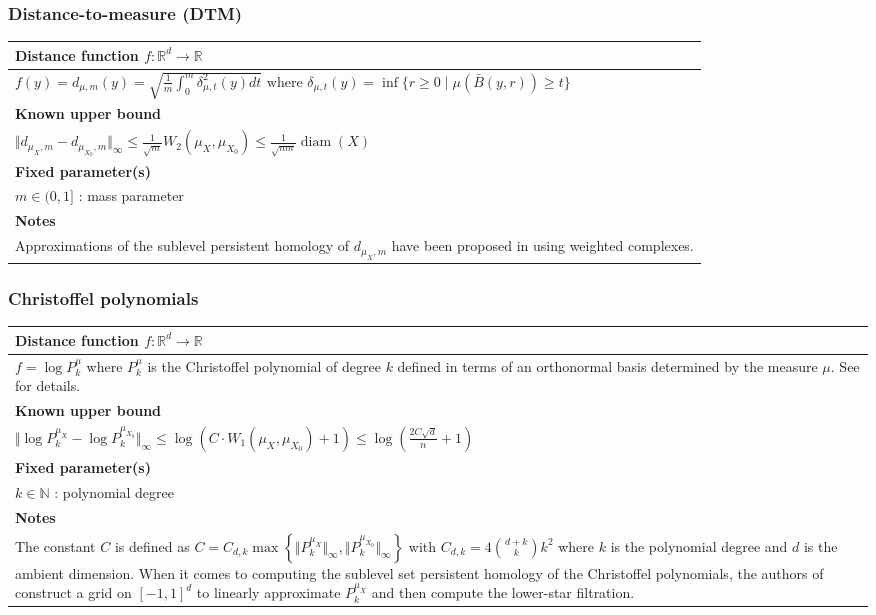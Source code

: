\documentclass[10pt,a4paper]{article}
\theoremstyle{definition}
\newcommand{\R}{\mathbb{R}}
\begin{document}
\subsubsection{Distance-to-measure (DTM)}
\begin{tabularx}{\textwidth}{|X|}
	\hline
	\textbf{Distance function $f\colon\R^d\to\R$}  \\ \hline
	$
	f(y) = d_{\mu, m}(y) = \sqrt{\frac{1}{m}\int_0^m\delta^2_{\mu,t}(y)dt}
	\text{ where }
	\delta_{\mu, t}(y) = \inf\{r\geq0\mid\mu(\bar{B}(y,r))\geq t\}
	$
	\\ \hline
	\textbf{Known upper bound \autocite{Buchet2013}}  \\ \hline
	$\Vert d_{\mu_X,m} - d_{\mu_{X_0},m}\Vert_\infty \leq \frac{1}{\sqrt{m}}W_2(\mu_X,\mu_{X_0})\leq \frac{1}{\sqrt{nm}}\operatorname{diam}(X)$
	\\ \hline
	\textbf{Fixed parameter(s)} \\ \hline
	$m\in(0,1]$ : mass parameter
	\\ \hline
	\textbf{Notes}              \\ \hline
	Approximations of the sublevel persistent homology of $d_{\mu_X, m}$ have been proposed in \autocite{Anai2018} using weighted complexes.
	\\ \hline
\end{tabularx}

\subsubsection{Christoffel polynomials}
\begin{tabularx}{\textwidth}{|X|}
	\hline
	\textbf{Distance function $f\colon\R^d\to\R$}  \\ \hline
	$f = \log P_k^{\mu}$ where $P_k^{\mu}$ is the Christoffel polynomial of degree $k$ defined in terms of an orthonormal basis determined by the measure $\mu$. See \autocite{Hoefgeest2022} for details.
	\\ \hline
	\textbf{Known upper bound \autocite{Hoefgeest2022}}  \\ \hline
	$\Vert\log P_k^{\mu_X}-\log P_k^{\mu_{X_0}}\Vert_\infty \leq \log(C\cdot W_1(\mu_X, \mu_{X_0}) + 1)\leq\log\left(\frac{2C\sqrt{d}}{n}+1\right)$
	\\ \hline
	\textbf{Fixed parameter(s)} \\ \hline
	$k\in\mathbb{N}$ : polynomial degree
	\\ \hline
	\textbf{Notes}              \\ \hline
	The constant $C$ is defined as $C=C_{d,k}\max\left\{\Vert P_k^{\mu_X}\Vert_\infty, \Vert P_k^{\mu_{X_0}}\Vert_\infty\right\}$ with $C_{d,k} = 4\binom{d+k}{k}k^2$ where $k$ is the polynomial degree and $d$ is the ambient dimension. When it comes to computing the sublevel set persistent homology of the Christoffel polynomials, the authors of \autocite{Hoefgeest2022} construct a grid on $[-1,1]^d$ to linearly approximate $P_k^{\mu_X}$ and then compute the lower-star filtration.
	\\ \hline
\end{tabularx}
\end{document}
